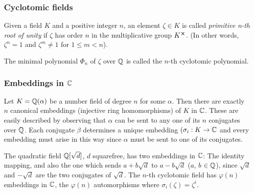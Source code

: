 \subsubsection*{Cyclotomic fields}

\begin{definition}
    Given a field $K$ and a positive integer $n$, an element $\zeta \in K$ is called \textit{primitive n-th root of unity} if $\zeta$ has order $n$ in the multiplicative group $K^{\cross}$. (In other words, $\zeta^n = 1$ and $\zeta^m \neq 1$ for $1 \leq m < n$).
\end{definition}

The minimal polynomial $\Phi_n$ of $\zeta$ over $\mathbb{Q}$ is called the $n$-th cyclotomic polynomial.

\subsubsection*{Embeddings in $\mathbb{C}$}
Let $K = \mathbb{Q}(\alpha)$ be a number field of degree $n$ for some $\alpha$. Then there are exactly $n$ canonical embeddings (injective ring homomorphisms) of $K$ in $\mathbb{C}$. These are easily described by observing that $\alpha$ can be sent to any one of its $n$ conjugates over $\mathbb{Q}$. Each conjugate $\beta$ determines a unique embedding $(\sigma_i: K \rightarrow \mathbb{C}$ and every embedding must arise in this way since $\alpha$ must be sent to one of its conjugates.

\begin{example}
    The quadratic field $\mathbb{Q}[\sqrt{d}]$, $d$ squarefree, has two embeddings in $\mathbb{C}$: The identity mapping, and also the one which sends $a + b\sqrt{d}$ to $a - b\sqrt{d}$ ($a$, $b$ $\in \mathbb{Q}$), since $\sqrt{d}$ and $-\sqrt{d}$ are the two conjugates of $\sqrt{d}$. The $n$-th cyclotomic field has $\varphi(n)$ embeddings in $\mathbb{C}$, the $\varphi(n)$ automorphisms where $\sigma_i(\zeta) = \zeta^i$.
\end{example}

\iffalse
\begin{corollary}
    Let $n = 2^r$ for some $r \in \Z$. The ideals in the ring of integers of the cyclotomic field of $2n$-th roots of unity $K = \Q[2n]$ are $n$-dimensional lattices.
\end{corollary}

\begin{proof}
    Note that the ideals have degree $\varphi(2n) = \varphi(2^{r+1}) = 2^{r+1} - 2^r = 2^r = n$. The rest follows by the previous theorem.
\end{proof}
\fi

